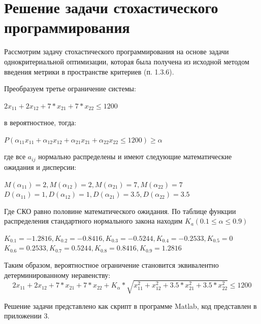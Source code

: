 \section{Решение задачи стохастического программирования}
Рассмотрим задачу стохастического программирования на основе задачи однокритериальной оптимизации, которая была получена из исходной методом введения метрики в пространстве критериев (п. 1.3.6).

Преобразуем третье ограничение системы:
\begin{center}
$2x_{11}+2x_{12}+7*x_{21}+7*x_{22} \leq 1200$
\end{center}

 в вероятностное, тогда:
\begin{center}
$P(\alpha_{11}x_{11}+\alpha_{12}x_{12}+\alpha_{21}x_{21}+\alpha_{22}x_{22} \leq 1200)\geq \alpha$
\end{center}
где все $a_{ij}$ нормально распределены и имеют следующие математические ожидания и дисперсии:
\begin{center}
$M(\alpha_{11})=2, M(\alpha_{12})=2, M(\alpha_{21})=7, M(\alpha_{22})=7$
$D(\alpha_{11})=1, D(\alpha_{12})=1, D(\alpha_{21})=3.5, D(\alpha_{22})=3.5$
\end{center}
Где СКО равно половине математического ожидания. По таблице функции распределения стандартного нормального закона  находим $K_a (0.1\leq \alpha\leq 0.9)$
\begin{center}
$K_{0.1}=-1.2816, K_{0.2}=-0.8416, K_{0.3}=-0.5244, K_{0.4}=-0.2533, K_{0.5}=0$
$K_{0.6}=0.2533, K_{0.7}=0.5244, K_{0.8}=0.8416, K_{0.9}=1.2816$
\end{center}
Таким образом, вероятностное ограничение становится эквивалентно детерминированному неравенству:	
\begin{equation}
2x_{11}+2x_{12}+7*x_{21}+7*x_{22}+K_{\alpha}*\sqrt{x_{11}^2+x_{12}^2+3.5*x_{21}^2+3.5*x_{22}^2} \leq 1200
\end{equation}



Решение задачи представлено как скрипт в программе Matlab, код представлен в приложении 3.

